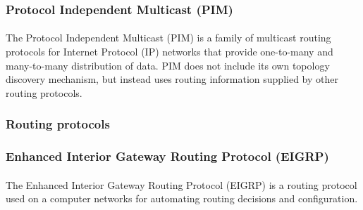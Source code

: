 \subsubsection*{Protocol Independent Multicast (PIM)\cite{PIMSM}\cite{PIMDM}}
\paragraph{}The Protocol Independent Multicast (PIM) is a family of multicast routing protocols for Internet Protocol (IP) networks that provide one-to-many and many-to-many distribution of data. PIM does not include its own topology discovery mechanism, but instead uses routing information supplied by other routing protocols.
\subsubsection{Routing protocols}
\subsubsection*{Enhanced Interior Gateway Routing Protocol (EIGRP)\cite{EIGRP}}
\paragraph{}The Enhanced Interior Gateway Routing Protocol (EIGRP) is a routing protocol used on a computer networks for automating routing decisions and configuration.
